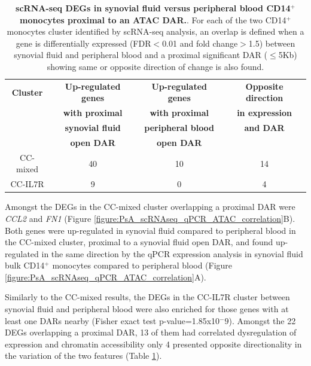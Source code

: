   
\begin{table}[htbp]
\centering
\begin{tabular}{@{} c c c c}
\toprule
\textbf{Cluster} & \textbf{Up-regulated genes}       &  \textbf{Up-regulated genes }     & \textbf{Opposite direction} \\
                 & \textbf{with proximal}            &  \textbf{with proximal}           & \textbf{in expression } \\
								 &	\textbf{synovial fluid}				   &  \textbf{peripheral blood}        & \textbf{and DAR}         \\
								 &	\textbf{open DAR}				         &  \textbf{open DAR}                &                           \\
\midrule
\midrule
 CC-mixed         & 40                                       &  10                                & 14 \\
 CC-IL7R          & 9                                        &  0                                 & 4 \\
\bottomrule
\end{tabular}
\medskip %
\caption[scRNA-seq DEGs in synovial fluid versus peripheral blood CD14$^+$ monocytes proximal to a DAR in Fast-ATAC.]{\textbf{scRNA-seq DEGs in synovial fluid versus peripheral blood CD14$^+$ monocytes proximal to an ATAC DAR.}. For each of the two CD14$^+$ monocytes cluster identified by scRNA-seq analysis, an overlap is defined when a gene is differentially expressed (FDR$<$0.01 and fold change$>$1.5) between synovial fluid and peripheral blood and a proximal significant DAR ($\leq$5Kb) showing same or opposite direction of change is also found.}
\label{tab:PSA_10X_CD14_clusters_and_ATAC_overlap}
\end{table}

Amongst the DEGs in the CC-mixed cluster overlapping a proximal DAR were \textit{CCL2} and \textit{FN1} (Figure \ref{figure:PsA_scRNAseq_qPCR_ATAC_correlation}B). Both genes were up-regulated in synovial fluid compared to peripheral blood in the CC-mixed cluster, proximal to a synovial fluid open DAR, and found up-regulated in the same direction by the qPCR expression analysis in synovial fluid bulk CD14$^+$ monocytes compared to peripheral blood (Figure \ref{figure:PsA_scRNAseq_qPCR_ATAC_correlation}A). 

Similarly to the CC-mixed results, the DEGs in the CC-IL7R cluster between synovial fluid and peripheral blood were also enriched for those genes with at least one DARs nearby (Fisher exact test p-value=1.85x10$^-9$). Amongst the 22 DEGs overlapping a proximal DAR, 13 of them had correlated dysregulation of expression and chromatin accessibility only 4 presented opposite directionality in the variation of the two features (Table \ref{tab:PSA_10X_CD14_clusters_and_ATAC_overlap}). 


